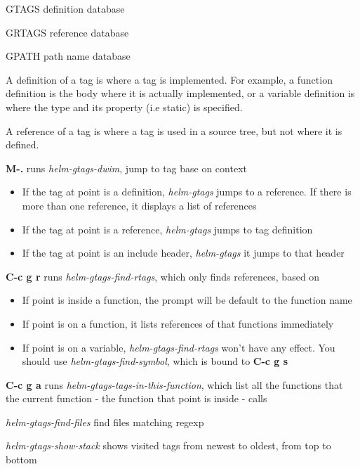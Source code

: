 \documentclass[10pt]{article}
\begin{document}
\begin{multicols}{3}
\begin{ttdesc}[labelwidth=\widthof{\texttt{report}}]
\item[GTAGS] definition database
\item[GRTAGS] reference database
\item[GPATH] path name database
\end{ttdesc}

A definition of a tag is where a tag is implemented. For example, a function definition is the body where it is actually implemented, or a variable definition is where the type and its property (i.e static) is specified.

A reference of a tag is where a tag is used in a source tree, but not where it is defined.

\begin{ttdesc}[labelwidth=\widthof{\texttt{report}}]

\item[\textbf{M-.}] runs \emph{helm-gtags-dwim}, jump to tag base on context
  \begin{itemize}
  \item If the tag at point is a definition, \emph{helm-gtags} jumps to a reference. If there is more than one reference, it displays a list of references
  \item If the tag at point is a reference, \emph{helm-gtags} jumps to tag definition
  \item If the tag at point is an include header, \emph{helm-gtags} it jumps to that header
  \end{itemize}
\item[\textbf{C-c g r}] runs \emph{helm-gtags-find-rtags}, which only finds references, based on
\begin{itemize}
  \item If point is inside a function, the prompt will be default to the function name
  \item If point is on a function, it lists references of that functions immediately
  \item If point is on a variable, \emph{helm-gtags-find-rtags} won't have any effect. You should use \emph{helm-gtags-find-symbol}, which is bound to \textbf{C-c g s}
\end{itemize}
\item[\textbf{C-c g a}] runs \emph{helm-gtags-tags-in-this-function}, which list all the functions that the current function - the function that point is inside - calls
\item[\emph{helm-gtags-find-files}] find files matching regexp
\item[\emph{helm-gtags-show-stack}] shows visited tags from newest to oldest, from top to bottom
\end{ttdesc}


\end{multicols}
\end{document}
